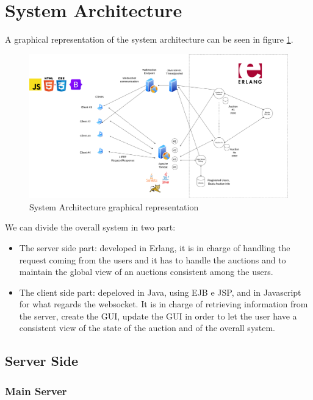 \section{System Architecture}
\noindent A graphical representation of the system architecture can be seen in figure \ref{fig:architecture}.

\begin{figure}[H]
	\centering
	\includegraphics[width=1\linewidth]{img/systemStructure.png}
	\caption{System Architecture graphical representation}
	\label{fig:architecture}
\end{figure}

\noindent We can divide the overall system in two part:
\begin{itemize}
	\item The server side part: developed in Erlang, it is in charge of handling the request coming from the users and it has to handle the auctions and to maintain the global view of an auctions consistent among the users.
	
	\item The client side part: depeloved in Java, using EJB e JSP, and in Javascript for what regards the websocket. It is in charge of retrieving information from the server, create the GUI, update the GUI in order to let the user have a consistent view of the state of the auction and of the overall system.
\end{itemize}

\subsection{Server Side}

\subsubsection{Main Server}

